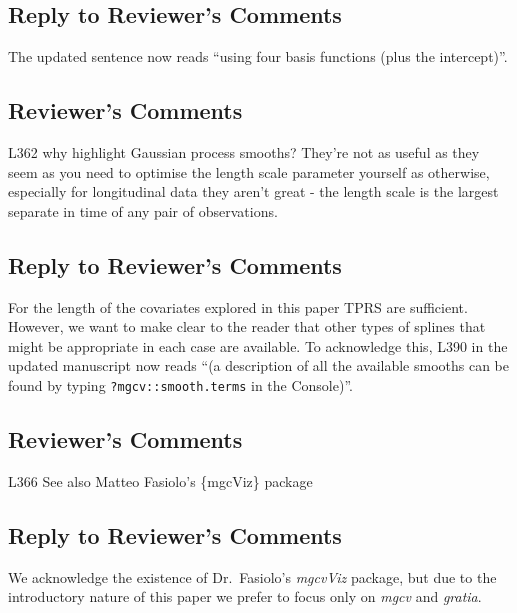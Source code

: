 \documentclass[
]{article}
\newcommand{\passthrough}[1]{#1}
\begin{document}
\hypertarget{section-28}{%
\subsection{\texorpdfstring{\textcolor{reviewersblue} {Reply to Reviewer's Comments}}{}}\label{section-28}}

The updated sentence now reads ``using four basis functions (plus the intercept)''.

\hypertarget{reviewers-comments-28}{%
\subsection{Reviewer's Comments}\label{reviewers-comments-28}}

L362 why highlight Gaussian process smooths? They're not as useful as they seem as you need to optimise the length scale parameter yourself as otherwise, especially for longitudinal data they aren't great - the length scale is the largest separate in time of any pair of observations.

\hypertarget{section-29}{%
\subsection{\texorpdfstring{\textcolor{reviewersblue} {Reply to Reviewer's Comments}}{}}\label{section-29}}

For the length of the covariates explored in this paper TPRS are sufficient. However, we want to make clear to the reader that other types of splines that might be appropriate in each case are available. To acknowledge this, L390 in the updated manuscript now reads ``(a description of all the available smooths can be found by typing \passthrough{\lstinline!?mgcv::smooth.terms!} in the Console)''.

\hypertarget{reviewers-comments-29}{%
\subsection{Reviewer's Comments}\label{reviewers-comments-29}}

L366 See also Matteo Fasiolo's \{mgcViz\} package

\hypertarget{section-30}{%
\subsection{\texorpdfstring{\textcolor{reviewersblue} {Reply to Reviewer's Comments}}{}}\label{section-30}}

We acknowledge the existence of Dr.~Fasiolo's \emph{mgcvViz} package, but due to the introductory nature of this paper we prefer to focus only on \emph{mgcv} and \emph{gratia}.
\end{document}
